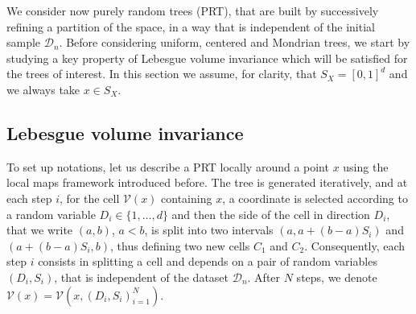 \documentclass[paper=a4, fontsize=11pt]{scrartcl}
\begin{document}



We consider now purely random trees (PRT), that are built by successively refining a partition of the space, in a way that is independent of the initial sample $\mathcal D_n$. Before considering uniform, centered and Mondrian trees, we start by studying a key property of Lebesgue volume invariance which will be satisfied for the trees of interest. In this section we assume, for clarity, that $S_X= [0,1] ^d$ and we always take $x\in S_X$.





\subsection{Lebesgue volume invariance}\label{subsection_VIR}





To set up notations, let us describe a PRT locally around a point $x$ using the local maps framework introduced before. The tree is generated iteratively, and at each step $i$, for the cell $\mathcal V(x)$ containing $x$, a coordinate is selected according to a random variable $D_i\in \{ 1,\ldots,d\}$ and then the side of the cell in direction $D_i$, that we write $(a,b)$, $a<b$, is split into two intervals $(a,a+(b-a)S_i)$ and $(a+(b-a)S_i,b)$, thus defining two new cells $C_1$ and $C_2$. Consequently, each step $i$ consists in splitting a cell and depends on a pair of random variables $(D_i,S_i)$, that is independent of the dataset $\mathcal D_n$. After $N$ steps, we denote $\mathcal V(x)=\mathcal V (x, (D_i,S_i)_{i=1}^N)$. 
\end{document}
